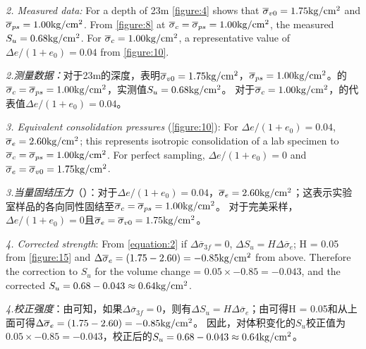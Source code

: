 \begin{paracol}{2}
    
    \emph{2. Measured data:} For a depth of 23m \autoref{figure:4} shows that $\overline{\sigma}_{v0}=1.75{\rm kg/cm^2}$ and $\overline{\sigma}_{ps}=1.00{\rm kg/cm^2}$. From \autoref{figure:8} at $\overline{\sigma}_c=\overline{\sigma}_{ps}=1.00{\rm kg/cm^2}$, the measured $S_u=0.68{\rm kg/cm^2}$. For $\overline{\sigma}_c=1.00{\rm kg/cm^2}$, a representative value of $\Delta{e}/(1+e_0)=0.04$ from \autoref{figure:10}.

    \switchcolumn

    \emph{2.测量数据：}对于23m的深度，表明$\overline{\sigma}_{v0}=1.75{\rm kg/cm^2}$，$\overline{\sigma}_{ps}=1.00{\rm kg/cm^2}$。的$\overline{\sigma}_c=\overline{\sigma}_{ps}=1.00{\rm kg/cm^2}$，实测值$S_u=0.68{\rm kg/cm^2}$。 对于$\overline{\sigma}_c=1.00{\rm kg/cm^2}$，的代表值$\Delta{e}/(1+e_0)=0.04$。

    \switchcolumn*

   \emph{3. Equivalent consolidation pressures} (\autoref{figure:10}): For $\Delta{e}/(1+e_0)=0.04$, $\overline{\sigma}_e=2.60{\rm kg/cm^2}$; this represents isotropic consolidation of a lab specimen to $\overline{\sigma}_c=\overline{\sigma}_{ps}=1.00{\rm kg/cm^2}$. For perfect sampling, $\Delta{e}/(1+e_0)=0$ and $\overline{\sigma}_e=\overline{\sigma}_{v0}=1.75{\rm kg/cm^2}$.

    \switchcolumn

    \emph{3.当量固结压力}（）：对于$\Delta{e}/(1+e_0)=0.04$，$\overline{\sigma}_e=2.60{\rm kg/cm^2}$；这表示实验室样品的各向同性固结至$\overline{\sigma}_c=\overline{\sigma}_{ps}=1.00{\rm kg/cm^2}$。 对于完美采样，$\Delta{e}/(1+e_0)=0$且$\overline{\sigma}_e=\overline{\sigma}_{v0}=1.75{\rm kg/cm^2}$。

    \switchcolumn*

    \emph{4. Corrected strength}: From \autoref{equation:2} if $\Delta{\overline{\sigma}_{3f}}=0$, $\Delta{S_u}=H\Delta{\overline{\sigma}_e}$; H = 0.05 from \autoref{figure:15} and $\Delta{\overline{\sigma}_e}=(1.75-2.60)=-0.85{\rm kg/cm^2}$ from above. Therefore the correction to $S_u$ for the volume change = $0.05\times{-0.85}=-0.043$, and the corrected $S_u=0.68-0.043\approx{0.64}{\rm kg/cm^2}$.

    \switchcolumn

    \emph{4.校正强度}：由可知，如果$\Delta{\overline{\sigma}_{3f}}=0$，则有$\Delta{S_u}=H\Delta{\overline{\sigma}_e}$；由可得H = 0.05和从上面可得$\Delta{\overline{\sigma}_e}=(1.75-2.60)=-0.85{\rm kg/cm^2}$。 因此，对体积变化的$S_u$校正值为$0.05\times{-0.85}=-0.043$，校正后的$S_u=0.68-0.043\approx{0.64}{\rm kg/cm^2}$。

\end{paracol}

